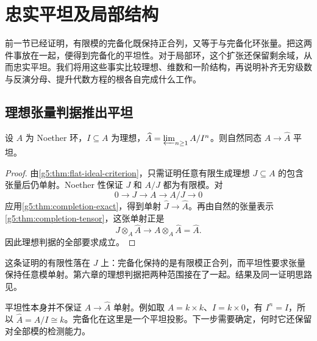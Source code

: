 
% 
% 

\section{忠实平坦及局部结构}
\label{g5:sec:0704}

前一节已经证明，有限模的完备化既保持正合列，又等于与完备化环张量。把这两件事放在一起，便得到完备化的平坦性。对于局部环，这个扩张还保留剩余域，从而忠实平坦。我们将用这些事实比较理想、维数和一阶结构，再说明补齐无穷级数与反演分母、提升代数方程的根各自完成什么工作。

\subsection{理想张量判据推出平坦}
\label{g5:subsec:0704:01}

\begin{theorem}\label{g5:thm:completion-flat}
	设 \(A\) 为 Noether 环，\(I\subseteq A\) 为理想，\(\widehat A=\varprojlim_{n\geq1}A/I^n\)。则自然同态 \(A\to\widehat A\) 平坦。
\end{theorem}
\begin{proof}
	由\cref{g5:thm:flat-ideal-criterion}，只需证明任意有限生成理想 \(J\subseteq A\) 的包含张量后仍单射。Noether 性保证 \(J\) 和 \(A/J\) 都为有限模。对
	\[
		0\longrightarrow J\longrightarrow A\longrightarrow A/J\longrightarrow0
	\]
	应用\cref{g5:thm:completion-exact}，得到单射 \(\widehat J\to\widehat A\)。再由自然的张量表示\cref{g5:thm:completion-tensor}，这张单射正是
	\[
		J\otimes_A\widehat A\longrightarrow A\otimes_A\widehat A=\widehat A.
	\]
	因此理想判据的全部要求成立。
\end{proof}

这条证明的有限性落在 \(J\) 上：完备化保持的是有限模正合列，而平坦性要求张量保持任意模单射。第六章的理想判据把两种范围接在了一起。结果及同一证明思路见\cite[第8节，定理8.8，第60页]{Matsumura1989}。

\ProseParagraphBreak

平坦性本身并不保证 \(A\to\widehat A\) 单射。例如取 \(A=k\times k\)、\(I=k\times0\)，有 \(I^n=I\)，所以 \(\widehat A=A/I\cong k\)。完备化在这里是一个平坦投影。下一步需要确定，何时它还保留对全部模的检测能力。

